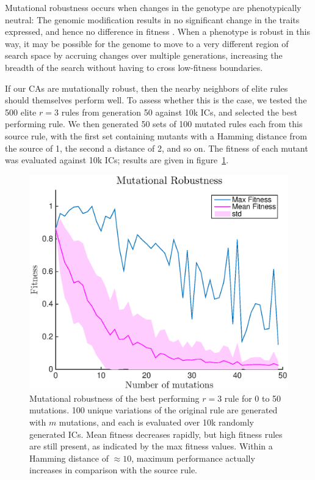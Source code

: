 Mutational robustness occurs when changes in the genotype are phenotypically neutral: The genomic modification results in no significant change 
in the traits expressed, and hence no difference in fitness \cite{wagner_role_2012}. When a phenotype is robust in this way, it may be possible for the 
genome to move to a very different region of search space by accruing changes over multiple generations, increasing the breadth of the search without 
having to cross low-fitness boundaries.

If our CAs are mutationally robust, then the nearby neighbors of elite rules should themselves perform well. To assess whether 
this is the case, we tested the 500 elite $r = 3$ rules from generation 50 against 10k ICs, and selected the best performing rule. 
We then generated 50 sets of 100 mutated rules each from this source rule, with the first set containing mutants with a Hamming distance from the 
source of 1, the second a distance of 2, and so on. The fitness of each mutant was evaluated against 10k ICs; results are given in 
figure~\ref{fig:robustness}.

\begin{figure}
\begin{center}
\includegraphics[width=\linewidth]{figures/mutational_robustness.eps}
\caption{Mutational robustness of the best performing $r = 3$ rule for 0 to 50 mutations. 100 unique variations of the 
original rule are generated with $m$ mutations, and each is evaluated over 10k randomly generated ICs. Mean fitness decreases 
rapidly, but high fitness rules are still present, as indicated by the max fitness values. Within a Hamming distance of $\approx 10$, maximum performance 
actually increases in comparison with the source rule. }
\label{fig:robustness}
\end{center}
\end{figure}

